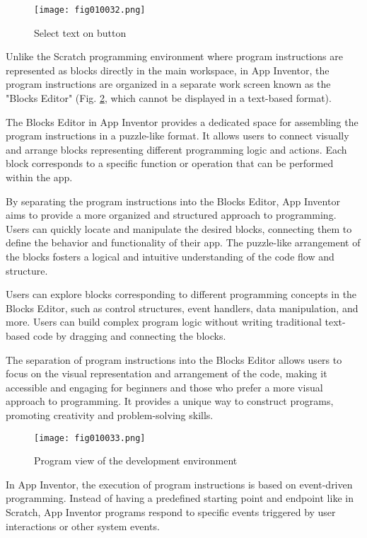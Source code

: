 \begin{figure}[H]
   \centering
   \texttt{[image: fig010032.png]}
   \caption{Select text on button}
\label{fig010032}
\end{figure}

Unlike the Scratch programming environment where program instructions are represented as blocks directly in the main workspace, in App Inventor, the program instructions are organized in a separate work screen known as the "Blocks Editor" (Fig. \ref{fig010033}, which cannot be displayed in a text-based format).

The Blocks Editor in App Inventor provides a dedicated space for assembling the program instructions in a puzzle-like format. It allows users to connect visually and arrange blocks representing different programming logic and actions. Each block corresponds to a specific function or operation that can be performed within the app.

By separating the program instructions into the Blocks Editor, App Inventor aims to provide a more organized and structured approach to programming. Users can quickly locate and manipulate the desired blocks, connecting them to define the behavior and functionality of their app. The puzzle-like arrangement of the blocks fosters a logical and intuitive understanding of the code flow and structure.

Users can explore blocks corresponding to different programming concepts in the Blocks Editor, such as control structures, event handlers, data manipulation, and more. Users can build complex program logic without writing traditional text-based code by dragging and connecting the blocks.

The separation of program instructions into the Blocks Editor allows users to focus on the visual representation and arrangement of the code, making it accessible and engaging for beginners and those who prefer a more visual approach to programming. It provides a unique way to construct programs, promoting creativity and problem-solving skills.

\begin{figure}[H]
   \centering
   \texttt{[image: fig010033.png]}
   \caption{Program view of the development environment}
\label{fig010033}
\end{figure}

In App Inventor, the execution of program instructions is based on event-driven programming. Instead of having a predefined starting point and endpoint like in Scratch, App Inventor programs respond to specific events triggered by user interactions or other system events.

